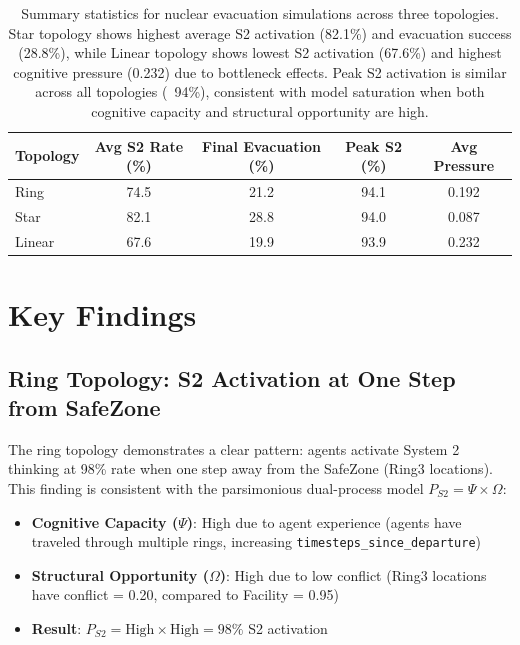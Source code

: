 \begin{table}[htbp]
    \centering
    \begin{tabular}{lcccc}
        \toprule
        Topology & Avg S2 Rate (\%) & Final Evacuation (\%) & Peak S2 (\%) & Avg Pressure \\
        \midrule
        Ring     & 74.5             & 21.2                & 94.1         & 0.192 \\
        Star     & 82.1             & 28.8                & 94.0         & 0.087 \\
        Linear   & 67.6             & 19.9                & 93.9         & 0.232 \\
        \bottomrule
    \end{tabular}
    \caption{Summary statistics for nuclear evacuation simulations across 
    three topologies. Star topology shows highest average S2 activation (82.1\%) 
    and evacuation success (28.8\%), while Linear topology shows lowest S2 
    activation (67.6\%) and highest cognitive pressure (0.232) due to bottleneck 
    effects. Peak S2 activation is similar across all topologies (~94\%), 
    consistent with model saturation when both cognitive capacity and structural 
    opportunity are high.}
    \label{tab:topology_comparison}
\end{table}

\section{Key Findings}

\subsection{Ring Topology: S2 Activation at One Step from SafeZone}

The ring topology demonstrates a clear pattern: agents activate System 2 
thinking at 98\% rate when one step away from the SafeZone (Ring3 locations). 
This finding is consistent with the parsimonious dual-process model 
$P_{S2} = \Psi \times \Omega$:

\begin{itemize}
    \item \textbf{Cognitive Capacity ($\Psi$)}: High due to agent experience 
          (agents have traveled through multiple rings, increasing 
          \texttt{timesteps\_since\_departure})
    \item \textbf{Structural Opportunity ($\Omega$)}: High due to low conflict 
          (Ring3 locations have conflict = 0.20, compared to Facility = 0.95)
    \item \textbf{Result}: $P_{S2} = \text{High} \times \text{High} = 98\%$ 
          S2 activation
\end{itemize}

